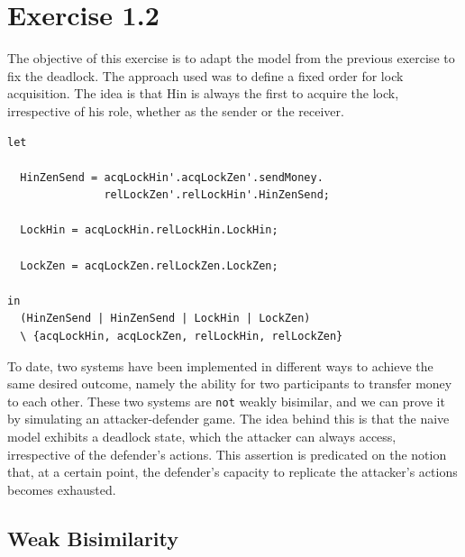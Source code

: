 \documentclass{report}
\begin{document}
\section*{Exercise 1.2}
The objective of this exercise is to adapt the model from the previous exercise to fix the deadlock. The approach used was to define a fixed order for lock acquisition. The idea is that Hin is always the first to acquire the lock, irrespective of his role, whether as the sender or the receiver.

\begin{verbatim}
let
  
  HinZenSend = acqLockHin'.acqLockZen'.sendMoney.
               relLockZen'.relLockHin'.HinZenSend;

  LockHin = acqLockHin.relLockHin.LockHin;

  LockZen = acqLockZen.relLockZen.LockZen;

in
  (HinZenSend | HinZenSend | LockHin | LockZen) 
  \ {acqLockHin, acqLockZen, relLockHin, relLockZen}
\end{verbatim}

To date, two systems have been implemented in different ways to achieve the same desired outcome, namely the ability for two participants to transfer money to each other. These two systems are \texttt{not} weakly bisimilar, and we can prove it by simulating an attacker-defender game. The idea behind this is that the naive model exhibits a deadlock state, which the attacker can always access, irrespective of the defender's actions. This assertion is predicated on the notion that, at a certain point, the defender's capacity to replicate the attacker's actions becomes exhausted.

\subsection*{Weak Bisimilarity}
\end{document}
